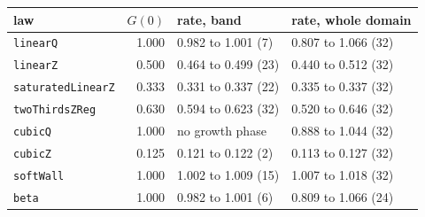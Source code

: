 \begin{tabular}{lrll}
\toprule
law & $G(0)$ & rate, band & rate, whole domain \\
\midrule
\texttt{linearQ} & 1.000 & 0.982 to 1.001 (7) & 0.807 to 1.066 (32) \\
\texttt{linearZ} & 0.500 & 0.464 to 0.499 (23) & 0.440 to 0.512 (32) \\
\texttt{saturatedLinearZ} & 0.333 & 0.331 to 0.337 (22) & 0.335 to 0.337 (32) \\
\texttt{twoThirdsZReg} & 0.630 & 0.594 to 0.623 (32) & 0.520 to 0.646 (32) \\
\texttt{cubicQ} & 1.000 & no growth phase & 0.888 to 1.044 (32) \\
\texttt{cubicZ} & 0.125 & 0.121 to 0.122 (2) & 0.113 to 0.127 (32) \\
\texttt{softWall} & 1.000 & 1.002 to 1.009 (15) & 1.007 to 1.018 (32) \\
\texttt{beta} & 1.000 & 0.982 to 1.001 (6) & 0.809 to 1.066 (24) \\
\bottomrule
\end{tabular}
